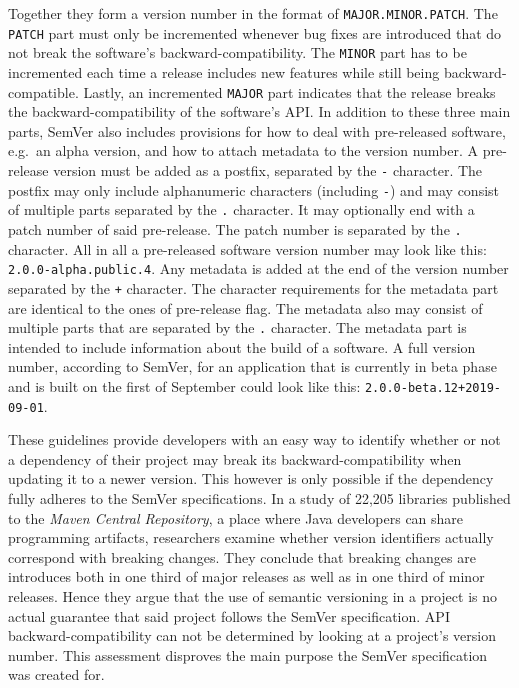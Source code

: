 Together they form a version number in the format of
\texttt{MAJOR.MINOR.PATCH}. The \texttt{PATCH} part must only be incremented
whenever bug fixes are introduced that do not break the software's
backward-compatibility. The \texttt{MINOR} part has to be incremented each
time a release includes new features while still being backward-compatible.
Lastly, an incremented \texttt{MAJOR} part indicates that the release breaks
the backward-compatibility of the software's \ac{API}. In addition to these
three main parts, SemVer also includes provisions for how to deal with
pre-released software, e.g.\ an alpha version, and how to attach metadata to
the version number. A pre-release version must be added as a postfix,
separated by the \texttt{-} character. The postfix may only include
alphanumeric characters (including \texttt{-}) and may consist of multiple
parts separated by the \texttt{.} character. It may optionally end with a patch
number of said pre-release. The patch number is separated by the \texttt{.}
character. All in all a pre-released software version number may look like
this: \texttt{2.0.0-alpha.public.4}. Any metadata is added at the end of the
version number separated by the \texttt{+} character. The character
requirements for the metadata part are identical to the ones of pre-release
flag. The metadata also may consist of multiple parts that are separated by the
\texttt{.} character. The metadata part is intended to include information
about the build of a software. A full version number, according to SemVer, for
an application that is currently in beta phase and is built on the first of
September could look like this: \texttt{2.0.0-beta.12+2019-09-01}.

These guidelines provide developers with an easy way to identify whether or not
a dependency of their project may break its backward-compatibility when
updating it to a newer version. This however is only possible if the dependency
fully adheres to the SemVer specifications. In a study
\autocite{RaemaekersSemanticVersioningversus2014} of 22,205 libraries published
to the \textit{Maven Central Repository}, a place where Java developers can
share programming artifacts, researchers examine whether version identifiers
actually correspond with breaking changes. They conclude that breaking changes
are introduces both in one third of major releases as well as in one third of
minor releases. Hence they argue that the use of semantic versioning in a
project is no actual guarantee that said project follows the SemVer
specification. \ac{API} backward-compatibility can not be determined by looking
at a project's version number. This assessment disproves the main purpose the
SemVer specification was created for.
